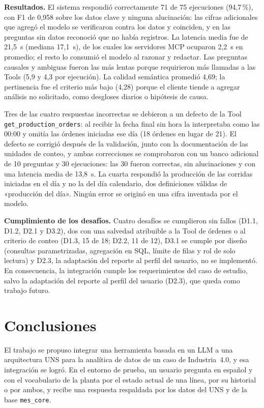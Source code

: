 \documentclass[11pt,letterpaper]{article}
\begin{document}
\textbf{Resultados.} El sistema respondió correctamente 71 de 75 ejecuciones (94,7\,\%), con F1 de 0,958 sobre los datos clave y ninguna alucinación: las cifras adicionales que agregó el modelo se verificaron contra los datos y coinciden, y en las preguntas sin datos reconoció que no había registros. La latencia media fue de 21,5~s (mediana 17,1~s), de los cuales los servidores MCP ocuparon 2,2~s en promedio; el resto lo consumió el modelo al razonar y redactar. Las preguntas causales y ambiguas fueron las más lentas porque requirieron más llamadas a las Tools (5,9 y 4,3 por ejecución). La calidad semántica promedió 4,69; la pertinencia fue el criterio más bajo (4,28) porque el cliente tiende a agregar análisis no solicitado, como desgloses diarios o hipótesis de causa.

Tres de las cuatro respuestas incorrectas se debieron a un defecto de la Tool \texttt{get\_production\_orders}: al recibir la fecha final sin hora la interpretaba como las 00:00 y omitía las órdenes iniciadas ese día (18 órdenes en lugar de 21). El defecto se corrigió después de la validación, junto con la documentación de las unidades de conteo, y ambas correcciones se comprobaron con un banco adicional de 10 preguntas y 30 ejecuciones: las 30 fueron correctas, sin alucinaciones y con una latencia media de 13,8~s. La cuarta respondió la producción de las corridas iniciadas en el día y no la del día calendario, dos definiciones válidas de «producción del día». Ningún error se originó en una cifra inventada por el modelo.

\textbf{Cumplimiento de los desafíos.} Cuatro desafíos se cumplieron sin fallos (D1.1, D1.2, D2.1 y D3.2), dos con una salvedad atribuible a la Tool de órdenes o al criterio de conteo (D1.3, 15 de 18; D2.2, 11 de 12), D3.1 se cumple por diseño (consultas parametrizadas, agregación en SQL, límite de filas y rol de solo lectura) y D2.3, la adaptación del reporte al perfil del usuario, no se implementó. En consecuencia, la integración cumple los requerimientos del caso de estudio, salvo la adaptación del reporte al perfil del usuario (D2.3), que queda como trabajo futuro.

\section{Conclusiones}

El trabajo se propuso integrar una herramienta basada en un LLM a una arquitectura UNS para la analítica de datos de un caso de Industria~4.0, y esa integración se logró. En el entorno de prueba, un usuario pregunta en español y con el vocabulario de la planta por el estado actual de una línea, por su historial o por ambos, y recibe una respuesta respaldada por los datos del UNS y de la base \texttt{mes\_core}.
\end{document}
